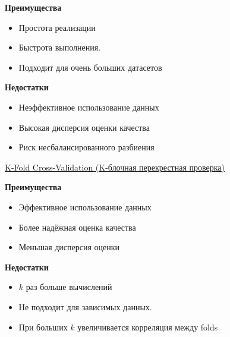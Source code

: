 \textbf{Преимущества}
\begin{itemize}
    \item Простота реализации
    \item Быстрота выполнения.
    \item Подходит для очень больших датасетов
\end{itemize}

\textbf{Недостатки}
\begin{itemize}
    \item Неэффективное использование данных
    \item Высокая дисперсия оценки качества
    \item Риск несбалансированного разбиения
\end{itemize}

\underline{K-Fold Cross-Validation (K-блочная перекрестная проверка)}


\textbf{Преимущества}
\begin{itemize}
    \item Эффективное использование данных
    \item Более надёжная оценка качества
    \item Меньшая дисперсия оценки
\end{itemize}

\textbf{Недостатки}
\begin{itemize}
    \item $k$ раз больше вычислений
    \item Не подходит для зависимых данных.
    \item При больших $k$ увеличивается корреляция между folds
\end{itemize}

